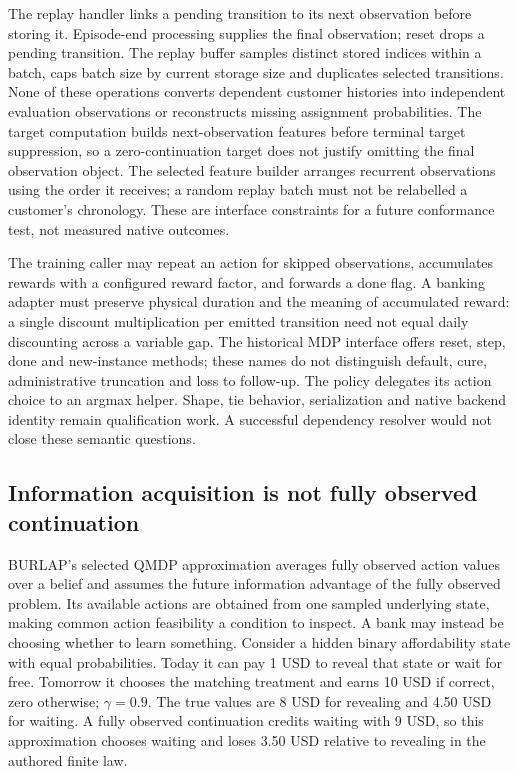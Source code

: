 The replay handler links a pending transition to its next observation before storing it. Episode-end processing supplies the final observation; reset drops a pending transition. The replay buffer samples distinct stored indices within a batch, caps batch size by current storage size and duplicates selected transitions. None of these operations converts dependent customer histories into independent evaluation observations or reconstructs missing assignment probabilities. The target computation builds next-observation features before terminal target suppression, so a zero-continuation target does not justify omitting the final observation object. The selected feature builder arranges recurrent observations using the order it receives; a random replay batch must not be relabelled a customer's chronology. These are interface constraints for a future conformance test, not measured native outcomes.~\citep{exec24_policyjava_rl4j}

The training caller may repeat an action for skipped observations, accumulates rewards with a configured reward factor, and forwards a done flag. A banking adapter must preserve physical duration and the meaning of accumulated reward: a single discount multiplication per emitted transition need not equal daily discounting across a variable gap. The historical MDP interface offers reset, step, done and new-instance methods; these names do not distinguish default, cure, administrative truncation and loss to follow-up. The policy delegates its action choice to an argmax helper. Shape, tie behavior, serialization and native backend identity remain qualification work. A successful dependency resolver would not close these semantic questions.~\citep{exec24_policyjava_rl4j}

\subsection{Information acquisition is not fully observed continuation}
BURLAP's selected QMDP approximation averages fully observed action values over a belief and assumes the future information advantage of the fully observed problem. Its available actions are obtained from one sampled underlying state, making common action feasibility a condition to inspect. A bank may instead be choosing whether to learn something. Consider a hidden binary affordability state with equal probabilities. Today it can pay 1 USD to reveal that state or wait for free. Tomorrow it chooses the matching treatment and earns 10 USD if correct, zero otherwise; $\gamma=0.9$. The true values are 8 USD for revealing and 4.50 USD for waiting. A fully observed continuation credits waiting with 9 USD, so this approximation chooses waiting and loses 3.50 USD relative to revealing in the authored finite law.~\citep{exec24_policyjava_burlap,exec24_policyjava_comparison}

